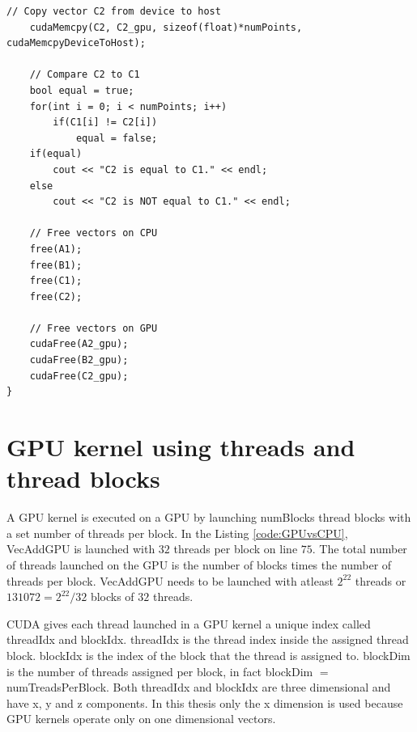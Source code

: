 \begin{lstlisting}[style=myCUDAstyle,caption={Comparison of CPU verse GPU code.},label={code:GPUvsCPU}]
	// Copy vector C2 from device to host
	cudaMemcpy(C2, C2_gpu, sizeof(float)*numPoints, cudaMemcpyDeviceToHost);

	// Compare C2 to C1
	bool equal = true;
	for(int i = 0; i < numPoints; i++)
		if(C1[i] != C2[i])
			equal = false;
	if(equal)
		cout << "C2 is equal to C1." << endl;
	else
		cout << "C2 is NOT equal to C1." << endl;

	// Free vectors on CPU
	free(A1);
	free(B1);
	free(C1);
	free(C2);

	// Free vectors on GPU
	cudaFree(A2_gpu);
	cudaFree(B2_gpu);
	cudaFree(C2_gpu);
}
\end{lstlisting}
\doublespacing

\section{GPU kernel using threads and thread blocks}
A GPU kernel is executed on a GPU by launching numBlocks thread blocks with a set number of threads per block.
In the Listing \ref{code:GPUvsCPU}, VecAddGPU is launched with $32$ threads per block on line $75$.
The total number of threads launched on the GPU is the number of blocks times the number of threads per block.
VecAddGPU needs to be launched with atleast $2^22$ threads or $131072 = 2^22/32$ blocks of $32$ threads.

CUDA gives each thread launched in a GPU kernel a unique index called threadIdx and blockIdx.
threadIdx is the thread index inside the assigned thread block.
blockIdx is the index of the block that the thread is assigned to.
blockDim is the number of threads assigned per block, in fact blockDim $=$ numTreadsPerBlock.
Both threadIdx and blockIdx are three dimensional and have x, y and z components.
In this thesis only the x dimension is used because GPU kernels operate only on one dimensional vectors.

